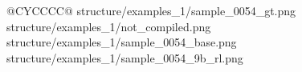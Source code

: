 \begin{table}[t]
\begin{tabularx}{\textwidth}{@{}CYCCCC@{}}
      {structure/examples_1/sample_0054_gt.png}
      {structure/examples_1/not_compiled.png}
      {structure/examples_1/sample_0054_base.png}
      {structure/examples_1/sample_0054_9b_rl.png}
    \bottomrule
\end{tabularx}
\end{table}